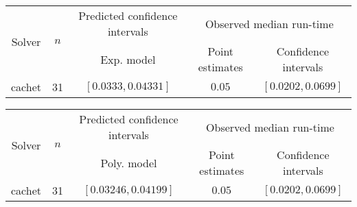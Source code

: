 \begin{tabular}{ccccc}
\hline 
\multirow{2}{*}{Solver} & \multirow{2}{*}{$n$} & Predicted confidence intervals & \multicolumn{2}{c}{Observed median  run-time}\tabularnewline
 &  & Exp. model  & Point estimates  & Confidence intervals\tabularnewline
\hline 
\hline 
\multirow{0}{*}{cachet} & 31 & $\mathbf{\left[0.0333,0.04331\right]}$ & $0.05$ & $\left[0.0202,0.0699\right]$ \tabularnewline 
\hline 
\end{tabular} 

\begin{tabular}{ccccc}
\hline 
\multirow{2}{*}{Solver} & \multirow{2}{*}{$n$} & Predicted confidence intervals & \multicolumn{2}{c}{Observed median  run-time}\tabularnewline
 &  & Poly. model  & Point estimates  & Confidence intervals\tabularnewline
\hline 
\hline 
\multirow{0}{*}{cachet} & 31 & $\mathbf{\left[0.03246,0.04199\right]}$ & $0.05$ & $\left[0.0202,0.0699\right]$ \tabularnewline 
\hline 
\end{tabular} 


